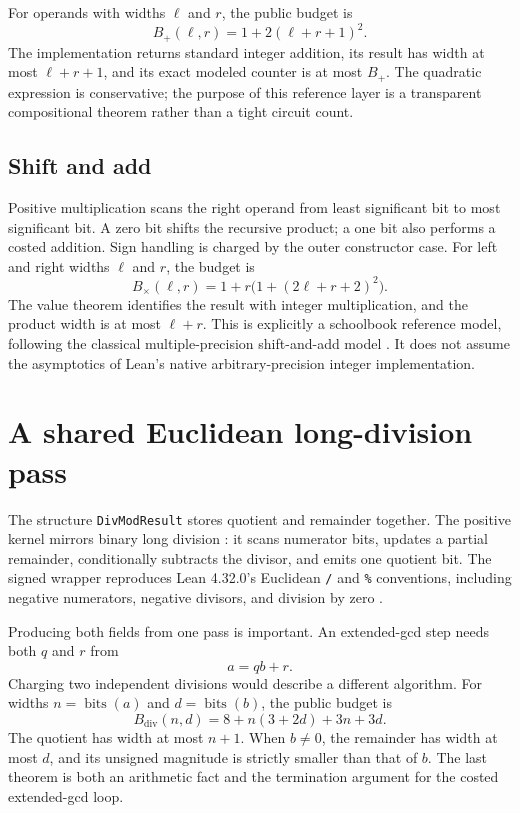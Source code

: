 \documentclass[11pt]{article}
\newcommand{\code}[1]{\texttt{#1}}
\newcommand{\bits}[1]{\operatorname{bits}(#1)}
\begin{document}
For operands with widths $\ell$ and $r$, the public budget is
\[
 B_{+}(\ell,r)=1+2(\ell+r+1)^2.
\]
The implementation returns standard integer addition, its result has width
at most $\ell+r+1$, and its exact modeled counter is at most $B_{+}$.  The
quadratic expression is conservative; the purpose of this reference layer is
a transparent compositional theorem rather than a tight circuit count.

\subsection{Shift and add}

Positive multiplication scans the right operand from least significant bit
to most significant bit.  A zero bit shifts the recursive product; a one bit
also performs a costed addition.  Sign handling is charged by the outer
constructor case.  For left and right widths $\ell$ and $r$, the budget is
\[
 B_{\times}(\ell,r)
 =1+r\bigl(1+(2\ell+r+2)^2\bigr).
\]
The value theorem identifies the result with integer multiplication, and the
product width is at most $\ell+r$.  This is explicitly a schoolbook
reference model, following the classical multiple-precision shift-and-add
model \citep[Section 4.3.1]{knuth1997seminumerical}.  It does not assume the
asymptotics of Lean's native arbitrary-precision integer implementation.

\section{A shared Euclidean long-division pass}

The structure \code{DivModResult} stores quotient and remainder together.
The positive kernel mirrors binary long division
\citep[Section 1.4]{brentZimmermann2010}: it scans numerator bits,
updates a partial remainder, conditionally subtracts the divisor, and emits
one quotient bit.  The signed wrapper reproduces Lean 4.32.0's Euclidean \code{/}
and \code{\%} conventions, including negative numerators, negative divisors,
and division by zero \citep{lean4320intDivMod}.

Producing both fields from one pass is important.  An extended-gcd step needs
both $q$ and $r$ from
\[
  a=qb+r.
\]
Charging two independent divisions would describe a different algorithm.
For widths $n=\bits{a}$ and $d=\bits{b}$, the public budget is
\[
 B_{\mathrm{div}}(n,d)
 =8+n(3+2d)+3n+3d.
\]
The quotient has width at most $n+1$.  When $b\ne 0$, the remainder has width
at most $d$, and its unsigned magnitude is strictly smaller than that of
$b$.  The last theorem is both an arithmetic fact and the termination
argument for the costed extended-gcd loop.
\end{document}

